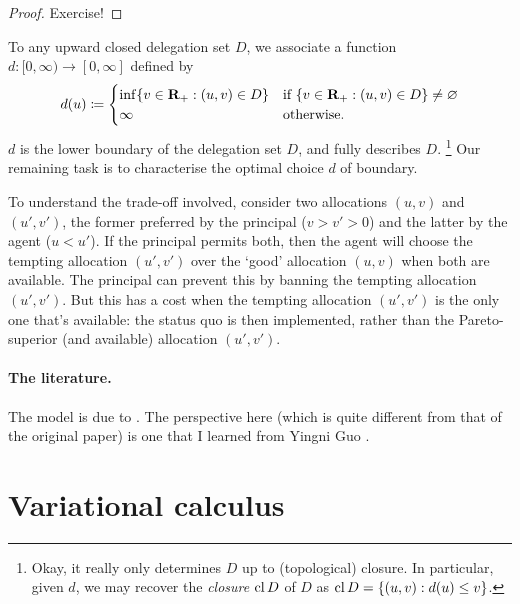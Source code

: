 \begin{proof}
	Exercise!
\end{proof}

To any upward closed delegation set $D$,
we associate a function $d : [0,\infty) \to [0,\infty]$ defined by
%
\begin{equation*}
	d(u)
	\coloneqq
	\begin{cases}
		\inf\left\{
		v \in \R_+ : (u,v) \in D
		\right\}
		& \text{if $\left\{
		v \in \R_+ : (u,v) \in D
		\right\} \neq \varnothing$} \\
		\infty
		& \text{otherwise.}
	\end{cases}
\end{equation*}
%
$d$ is the lower boundary of the delegation set $D$, and fully describes $D$.%
	\footnote{Okay, it really only determines $D$ up to (topological) closure.
	In particular, given $d$, we may recover the \emph{closure} $\operatorname*{cl} D$ of $D$ as $\cl D = \left\{ (u,v) : d(u) \leq v \right\}$.}
Our remaining task is to characterise the optimal choice $d$ of boundary.

To understand the trade-off involved,
consider two allocations $(u,v)$ and $(u',v')$, the former preferred by the principal ($v>v'>0$) and the latter by the agent ($u<u'$).
If the principal permits both, then the agent will choose the tempting allocation $(u',v')$ over the `good' allocation $(u,v)$ when both are available.
The principal can prevent this by banning the tempting allocation $(u',v')$.
But this has a cost when the tempting allocation $(u',v')$ is the only one that's available: the status quo is then implemented, rather than the Pareto-superior (and available) allocation $(u',v')$.


\paragraph{The literature.} The model is due to \textcite{ArmstrongVickers2010}. The perspective here (which is quite different from that of the original paper) is one that I learned from Yingni Guo \parencite[see][]{GuoShmaya2022}.



\section{Variational calculus}
\label{sec:ch4:variation}

